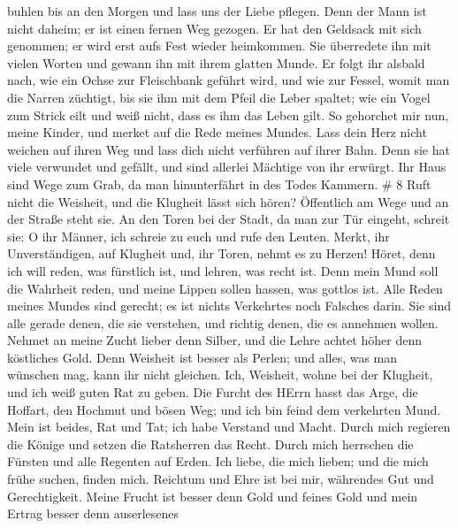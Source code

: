 buhlen bis an den Morgen und lass uns der Liebe pflegen. 
Denn der Mann ist nicht daheim; er ist einen fernen Weg gezogen.
 Er hat den Geldsack mit sich genommen; er wird erst aufs
Fest wieder heimkommen.  Sie überredete ihn mit vielen
Worten und gewann ihn mit ihrem glatten Munde.  Er folgt
ihr alsbald nach, wie ein Ochse zur Fleischbank geführt wird, und wie
zur Fessel, womit man die Narren züchtigt,  bis sie ihm mit
dem Pfeil die Leber spaltet; wie ein Vogel zum Strick eilt und weiß
nicht, dass es ihm das Leben gilt.  So gehorchet mir nun,
meine Kinder, und merket auf die Rede meines Mundes.  Lass
dein Herz nicht weichen auf ihren Weg und lass dich nicht verführen auf
ihrer Bahn.  Denn sie hat viele verwundet und gefällt, und
sind allerlei Mächtige von ihr erwürgt.  Ihr Haus sind Wege
zum Grab, da man hinunterfährt in des Todes Kammern. \# 8 
Ruft nicht die Weisheit, und die Klugheit lässt sich hören? 
Öffentlich am Wege und an der Straße steht sie.  An den
Toren bei der Stadt, da man zur Tür eingeht, schreit sie:  O
ihr Männer, ich schreie zu euch und rufe den Leuten.  Merkt,
ihr Unverständigen, auf Klugheit und, ihr Toren, nehmt es zu Herzen!
 Höret, denn ich will reden, was fürstlich ist, und lehren,
was recht ist.  Denn mein Mund soll die Wahrheit reden, und
meine Lippen sollen hassen, was gottlos ist.  Alle Reden
meines Mundes sind gerecht; es ist nichts Verkehrtes noch Falsches
darin.  Sie sind alle gerade denen, die sie verstehen, und
richtig denen, die es annehmen wollen.  Nehmet an meine
Zucht lieber denn Silber, und die Lehre achtet höher denn köstliches
Gold.  Denn Weisheit ist besser als Perlen; und alles, was
man wünschen mag, kann ihr nicht gleichen.  Ich, Weisheit,
wohne bei der Klugheit, und ich weiß guten Rat zu geben. 
Die Furcht des HErrn hasst das Arge, die Hoffart, den Hochmut und bösen
Weg; und ich bin feind dem verkehrten Mund.  Mein ist
beides, Rat und Tat; ich habe Verstand und Macht.  Durch
mich regieren die Könige und setzen die Ratsherren das Recht.
 Durch mich herrschen die Fürsten und alle Regenten auf
Erden.  Ich liebe, die mich lieben; und die mich frühe
suchen, finden mich.  Reichtum und Ehre ist bei mir,
währendes Gut und Gerechtigkeit.  Meine Frucht ist besser
denn Gold und feines Gold und mein Ertrag besser denn auserlesenes
